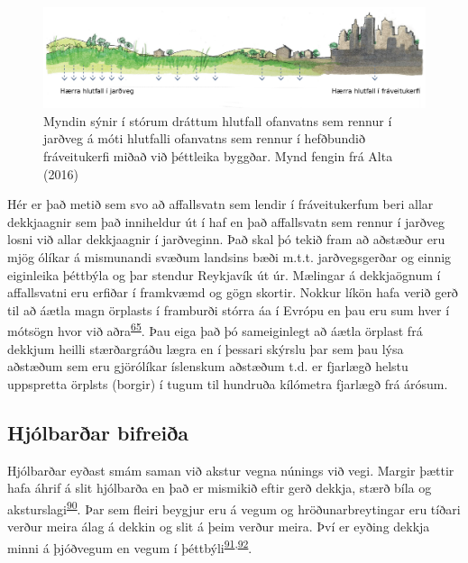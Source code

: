 \documentclass[icelandic,]{book}
\begin{document}
\begin{figure}

{\centering \includegraphics[width=1\linewidth]{myndir/ALTA} 

}

\caption{Myndin sýnir í stórum dráttum hlutfall ofanvatns sem rennur í jarðveg á móti hlutfalli ofanvatns sem rennur í hefðbundið fráveitukerfi miðað við þéttleika byggðar. Mynd fengin frá Alta (2016)}\label{fig:ALTA}
\end{figure}

Hér er það metið sem svo að affallsvatn sem lendir í fráveitukerfum beri allar dekkjaagnir sem það inniheldur út í haf en það affallsvatn sem rennur í jarðveg losni við allar dekkjaagnir í jarðveginn. Það skal þó tekið fram að aðstæður eru mjög ólíkar á mismunandi svæðum landsins bæði m.t.t. jarðvegsgerðar og einnig eiginleika þéttbýla og þar stendur Reykjavík út úr. Mælingar á dekkjaögnum í affallsvatni eru erfiðar í framkvæmd og gögn skortir. Nokkur líkön hafa verið gerð til að áætla magn örplasts í framburði stórra áa í Evrópu en þau eru sum hver í mótsögn hvor við aðra\textsuperscript{\protect\hyperlink{ref-unice2019characterizing1}{65}}. Þau eiga það þó sameiginlegt að áætla örplast frá dekkjum heilli stærðargráðu lægra en í þessari skýrslu þar sem þau lýsa aðstæðum sem eru gjörólíkar íslenskum aðstæðum t.d. er fjarlægð helstu uppspretta örplsts (borgir) í tugum til hundruða kílómetra fjarlægð frá árósum.

\hypertarget{hjolbarar-bifreia}{%
\subsection*{Hjólbarðar bifreiða}\label{hjolbarar-bifreia}}

Hjólbarðar eyðast smám saman við akstur vegna núnings við vegi. Margir þættir hafa áhrif á slit hjólbarða en það er mismikið eftir gerð dekkja, stærð bíla og aksturslagi\textsuperscript{\protect\hyperlink{ref-panko2018review}{90}}. Þar sem fleiri beygjur eru á vegum og hröðunarbreytingar eru tíðari verður meira álag á dekkin og slit á þeim verður meira. Því er eyðing dekkja minni á þjóðvegum en vegum í þéttbýli\textsuperscript{\protect\hyperlink{ref-luhana2004measurement}{91},\protect\hyperlink{ref-Kwak2013}{92}}.
\end{document}
